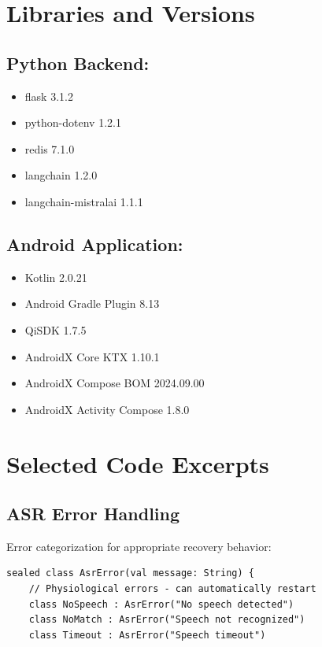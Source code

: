 \documentclass[a4paper]{article}
\begin{document}
\begin{appendices}

\section{Libraries and Versions}

\subsection{Python Backend:}
\begin{itemize}[noitemsep]
    \item flask 3.1.2
    \item python-dotenv 1.2.1
    \item redis 7.1.0
    \item langchain 1.2.0
    \item langchain-mistralai 1.1.1
\end{itemize}

\subsection{Android Application:}
\begin{itemize}[noitemsep]
    \item Kotlin 2.0.21
    \item Android Gradle Plugin 8.13
    \item QiSDK 1.7.5
    \item AndroidX Core KTX 1.10.1
    \item AndroidX Compose BOM 2024.09.00
    \item AndroidX Activity Compose 1.8.0
\end{itemize}

\section{Selected Code Excerpts}
\label{app:code}

\subsection{ASR Error Handling}
\label{app:asr-error}
Error categorization for appropriate recovery behavior:

\begin{lstlisting}[style=kotlinstyle, caption={ASR error handling from HandsFreeAsr.kt}]
sealed class AsrError(val message: String) {
    // Physiological errors - can automatically restart
    class NoSpeech : AsrError("No speech detected")
    class NoMatch : AsrError("Speech not recognized")
    class Timeout : AsrError("Speech timeout")


\end{lstlisting}
\end{appendices}
\end{document}
